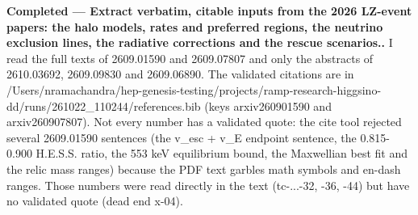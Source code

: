 \documentclass[11pt,a4paper]{article}
\begin{document}
\textbf{Completed --- Extract verbatim, citable inputs from the 2026 LZ-event papers: the halo models, rates and preferred regions, the neutrino exclusion lines, the radiative corrections and the rescue scenarios..} I read the full texts of 2609.01590 and 2609.07807 and only the abstracts of 2610.03692, 2609.09830 and 2609.06890. The validated citations are in /Users/nramachandra/hep-genesis-testing/projects/ramp-research-higgsino-dd/runs/261022\_110244/references.bib (keys arxiv260901590 and arxiv260907807). Not every number has a validated quote: the cite tool rejected several 2609.01590 sentences (the v\_esc + v\_E endpoint sentence, the 0.815-0.900 H.E.S.S. ratio, the 553 keV equilibrium bound, the Maxwellian best fit and the relic mass ranges) because the PDF text garbles math symbols and en-dash ranges. Those numbers were read directly in the text (tc-...-32, -36, -44) but have no validated quote (dead end x-04).
\end{document}
